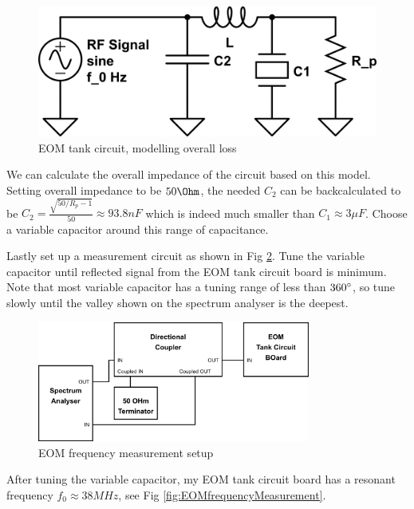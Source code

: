 \documentclass[12pt]{report}
\begin{document}
\begin{figure}[H]
    \centering
    \includegraphics[width=.8\textwidth]{eom-tank-cirucuit2.png}
    \caption{EOM tank circuit, modelling overall loss}
    \label{fig:eom-tank-cirucuit2}
\end{figure}

We can calculate the overall impedance of the circuit based on this model. Setting overall impedance to be $50\Ohm$, the needed $C_2$ can be backcalculated to be $C_2 = \frac{\sqrt{50/R_p -1}}{50} \approx 93.8 nF$ which is indeed much smaller than $C_1 \approx 3 \mu F$. Choose a variable capacitor around this range of capacitance. 
\par
Lastly set up a measurement circuit as shown in Fig \ref{fig:eom-freq-measurement-setup.png}. Tune the variable capacitor until reflected signal from the EOM tank circuit board is minimum. Note that most variable capacitor has a tuning range of less than $360\degree$, so tune slowly until the valley shown on the spectrum analyser is the deepest. 

\begin{figure}[H]
    \centering
    \includegraphics[width=0.8\textwidth]{eom-freq-measurement-setup.png}
    \caption{EOM frequency measurement setup}
    \label{fig:eom-freq-measurement-setup.png}
\end{figure}

After tuning the variable capacitor, my EOM tank circuit board has a resonant frequency $f_0 \approx 38 MHz$, see Fig \ref{fig:EOMfrequencyMeasurement}. 
\end{document}
